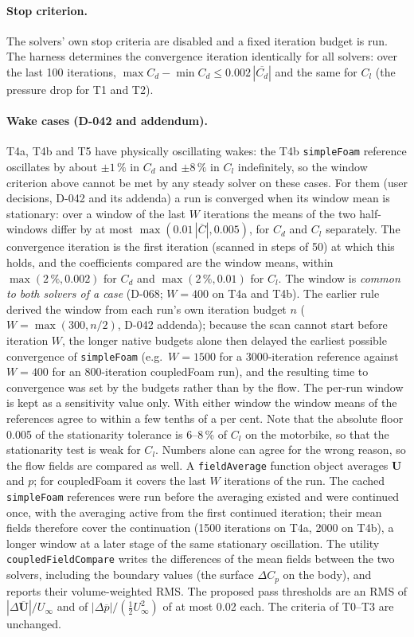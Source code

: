 \documentclass[11pt,a4paper]{article}
\newcommand{\vect}[1]{\mathbf{#1}}
\newcommand{\Uv}{\vect{U}}
\newcommand{\code}[1]{\texttt{#1}}
\begin{document}
\paragraph{Stop criterion.} The solvers' own stop criteria are disabled and
a fixed iteration budget is run. The harness determines the convergence
iteration identically for all solvers: over the last 100 iterations,
$\max C_d-\min C_d\le0.002\,|\overline{C_d}|$ and the same for $C_l$ (the
pressure drop for T1 and T2).

\paragraph{Wake cases (D-042 and addendum).} T4a, T4b and T5 have physically
oscillating wakes: the T4b \code{simpleFoam} reference oscillates by about
$\pm1\,\%$ in $C_d$ and $\pm8\,\%$ in $C_l$ indefinitely, so the window
criterion above cannot be met by any steady solver on these cases. For them
(user decisions, D-042 and its addenda) a run is converged when its window
mean is stationary: over a window of the last $W$ iterations the means of
the two half-windows differ by at most $\max(0.01\,|\overline{C}|,0.005)$,
for $C_d$ and $C_l$ separately. The convergence iteration is the first
iteration (scanned in steps of 50) at which this holds, and the coefficients
compared are the window means, within $\max(2\,\%,0.002)$ for $C_d$ and
$\max(2\,\%,0.01)$ for $C_l$. The window is \emph{common to both solvers of
a case} (D-068; $W=400$ on T4a and T4b). The earlier rule derived the window
from each run's own iteration budget $n$ ($W=\max(300,n/2)$, D-042 addenda);
because the scan cannot start before iteration $W$, the longer native
budgets alone then delayed the earliest possible convergence of
\code{simpleFoam} (e.g.\ $W=1500$ for a 3000-iteration reference against
$W=400$ for an 800-iteration coupledFoam run), and the resulting time to
convergence was set by the budgets rather than by the flow. The per-run
window is kept as a sensitivity value only. With either window the window
means of the references agree to within a few tenths of a per cent. Note
that the absolute floor 0.005 of the stationarity tolerance is 6--8\,\% of
$C_l$ on the motorbike, so that the stationarity test is weak for $C_l$.
Numbers alone can agree for the wrong reason, so the flow fields are
compared as well. A \code{fieldAverage} function object averages $\Uv$ and
$p$; for coupledFoam it covers the last $W$ iterations of the run. The
cached \code{simpleFoam} references were run before the averaging existed
and were continued once, with the averaging active from the first continued
iteration; their mean fields therefore cover the continuation (1500
iterations on T4a, 2000 on T4b), a longer window at a later stage of the
same stationary oscillation. The utility \code{coupledFieldCompare} writes
the differences of the mean fields between the two solvers, including the
boundary values (the surface $\Delta C_p$ on the body), and reports their
volume-weighted RMS. The proposed pass thresholds are an RMS of
$|\Delta\overline{\Uv}|/U_\infty$ and of
$|\Delta\overline{p}|/(\tfrac12U_\infty^2)$ of at most 0.02 each. The
criteria of T0--T3 are unchanged.
\end{document}
